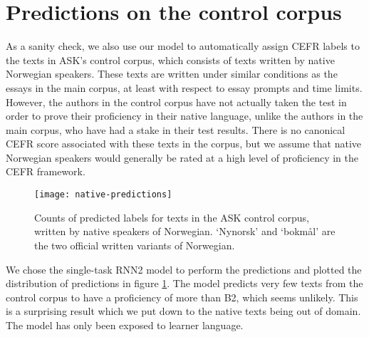 \section{Predictions on the control corpus}

As a sanity check, we also use our model to automatically assign CEFR labels
to the texts in ASK's control corpus, which consists of texts written by
native Norwegian speakers. These texts are written under similar conditions
as the essays in the main corpus, at least with respect to essay prompts and
time limits. However, the authors in the control corpus have not actually
taken the test in order to prove their proficiency in their native language,
unlike the authors in the main corpus, who have had a stake in their test
results. There is no canonical CEFR score associated with these texts in the
corpus, but we assume that native Norwegian speakers would generally be rated
at a high level of proficiency in the CEFR framework.

\begin{figure}
  \centering
  \texttt{[image: native-predictions]}
  \caption[Predicted CEFR score for native Norwegian speakers]{
    Counts of predicted labels for texts in the ASK control corpus, written
    by native speakers of Norwegian. `Nynorsk' and `bokmål' are the two
    official written variants of Norwegian.
  }
  \label{native-predictions}
\end{figure}

We chose the single-task RNN2 model to perform the predictions and plotted
the distribution of predictions in figure \ref{native-predictions}. The model
predicts very few texts from the control corpus to have a proficiency of more
than B2, which seems unlikely. This is a surprising result which we put down
to the native texts being out of domain. The model has only been exposed to
learner language.
